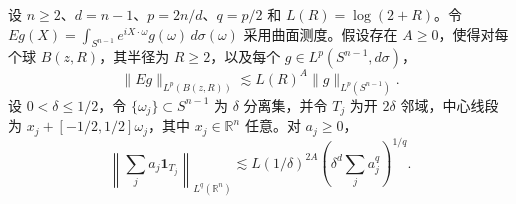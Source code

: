 设 \(n\ge2\)、\(d=n-1\)、\(p=2n/d\)、\(q=p/2\) 和 \(L(R)=\log(2+R)\)。令 \(Eg(X)=\int_{S^{n-1}}e^{iX\cdot\omega}g(\omega)\,d\sigma(\omega)\) 采用曲面测度。假设存在 \(A\ge0\)，使得对每个球 \(B(z,R)\)，其半径为 \(R\ge2\)，以及每个 \(g\in L^p(S^{n-1},d\sigma)\)，
\[
 \|Eg\|_{L^p(B(z,R))}\lesssim L(R)^A\|g\|_{L^p(S^{n-1})}.
\]
设 \(0<\delta\le1/2\)，令 \(\{\omega_j\}\subset S^{n-1}\) 为 \(\delta\) 分离集，并令 \(T_j\) 为开 \(2\delta\) 邻域，中心线段为 \(x_j+[-1/2,1/2]\omega_j\)，其中 \(x_j\in\mathbb R^n\) 任意。对 \(a_j\ge0\)，
\[
 \left\|\sum_j a_j\mathbf1_{T_j}\right\|_{L^q(\mathbb R^n)}
 \lesssim L(1/\delta)^{2A}\left(\delta^d\sum_j a_j^q\right)^{1/q}.
\]
